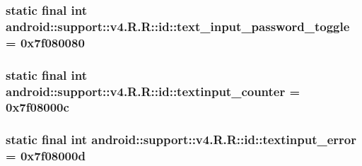\hypertarget{classandroid_1_1support_1_1v4_1_1_r_1_1id_85861864544cd8b75f06bb6641db0424}{
\subsubsection[{text\_\-input\_\-password\_\-toggle}]{\setlength{\rightskip}{0pt plus 5cm}static final int android::support::v4.R.R::id::text\_\-input\_\-password\_\-toggle = 0x7f080080}}
\label{classandroid_1_1support_1_1v4_1_1_r_1_1id_85861864544cd8b75f06bb6641db0424}


\hypertarget{classandroid_1_1support_1_1v4_1_1_r_1_1id_0a72dc2456999a3dbbf6bea9b36f4751}{
\subsubsection[{textinput\_\-counter}]{\setlength{\rightskip}{0pt plus 5cm}static final int android::support::v4.R.R::id::textinput\_\-counter = 0x7f08000c}}
\label{classandroid_1_1support_1_1v4_1_1_r_1_1id_0a72dc2456999a3dbbf6bea9b36f4751}


\hypertarget{classandroid_1_1support_1_1v4_1_1_r_1_1id_fc50741e4c40743509bbb46ced8e7315}{
\subsubsection[{textinput\_\-error}]{\setlength{\rightskip}{0pt plus 5cm}static final int android::support::v4.R.R::id::textinput\_\-error = 0x7f08000d}}
\label{classandroid_1_1support_1_1v4_1_1_r_1_1id_fc50741e4c40743509bbb46ced8e7315}


